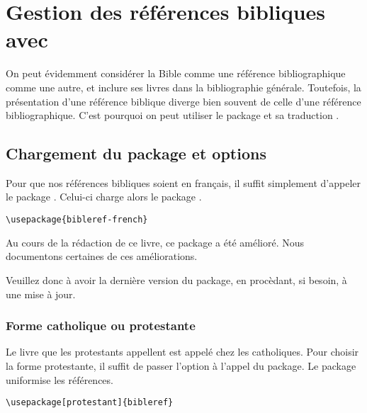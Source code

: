 \chapter{Gestion des références bibliques avec }

\begin{prealable}

On peut évidemment considérer la Bible comme une référence bibliographique comme une autre, et inclure ses livres dans la bibliographie générale.
Toutefois, la présentation d'une référence biblique diverge bien souvent de celle d'une référence bibliographique.
C'est pourquoi on peut utiliser le package  et sa traduction .
\end{prealable}


\section{Chargement du package et options}

Pour que nos références bibliques soient en français, il suffit simplement d'appeler le package . Celui-ci charge alors le package .


\begin{verbatim}
\usepackage{bibleref-french}
\end{verbatim}

\begin{attention}
Au cours de la rédaction de ce livre, ce package a été amélioré. Nous documentons certaines de ces améliorations. 

Veuillez donc à avoir la dernière version du package, en procèdant, si besoin, à une mise à jour.

\end{attention}

\subsection{Forme catholique ou protestante}
Le livre que les protestants appellent  est appelé  chez les catholiques. Pour choisir la forme protestante, il suffit de passer l'option  à l'appel du package. Le package uniformise les références.

\begin{verbatim}
\usepackage[protestant]{bibleref}
\end{verbatim}


